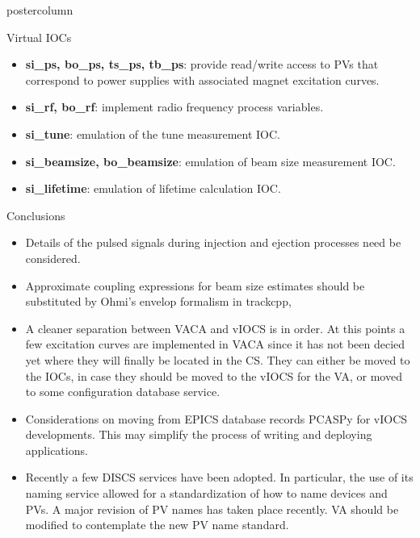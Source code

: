 \documentclass[20pt]{beamer}
\begin{document}
\begin{frame}
\begin{columns}
\begin{column}{.55\textwidth}
\begin{beamercolorbox}[center]{postercolumn}
\begin{minipage}{.98\textwidth}
{\begin{myblock}{Virtual IOCs}
\begin{itemize}
					\item \textbf{si\_ps, bo\_ps, ts\_ps, tb\_ps}: provide read/write access to PVs that correspond to power supplies with associated magnet excitation curves.
					\item \textbf{si\_rf, bo\_rf}: implement radio frequency process variables.
					\item \textbf{si\_tune}: emulation of the tune measurement IOC.
					\item \textbf{si\_beamsize, bo\_beamsize}: emulation of beam size measurement IOC.
					\item \textbf{si_lifetime}: emulation of lifetime calculation IOC.
					\end{itemize}
						\vspace{0.5cm}
					\end{myblock}\vfill
					\begin{myblock}{Conclusions}
					\begin{itemize}
					\item Details of the pulsed signals during injection and ejection processes need be considered.
					\item Approximate coupling expressions for beam size estimates should be substituted by Ohmi's envelop formalism\cite{ohmi} in trackcpp,
					\item A cleaner separation between VACA and vIOCS is in order. At this points a few excitation curves are implemented in VACA since it has not been decied yet where they will finally be located in the CS. They can either be moved to the IOCs, in case they should be moved to the vIOCS for the VA, or moved to some configuration database service.
					\item Considerations on moving from EPICS database records PCASPy for vIOCS developments. This may simplify the process of writing and deploying applications.
					\item Recently a few DISCS\cite{discs} services have been adopted. In particular, the use of its naming service allowed for a standardization of how to name devices and PVs. A major revision of PV names has taken place recently. VA should be modified to contemplate the new PV name standard.
					\end{itemize}
						\vspace{0.5cm}
					\end{myblock}\vfill
		}\end{minipage}\end{beamercolorbox}
	\end{column}
\end{columns}
\end{frame}
\end{document}
